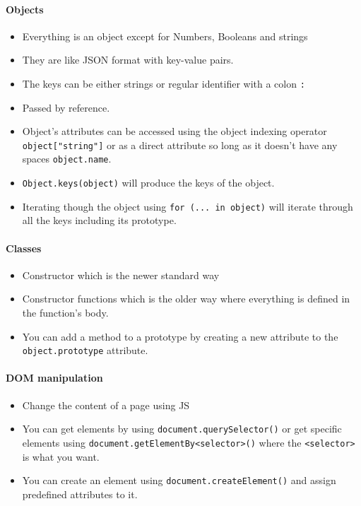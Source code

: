 \documentclass[../CMPUT-404-Notes.tex]{subfiles}
\begin{document}
\paragraph{Objects}
\begin{itemize}
  \item Everything is an object except for Numbers, Booleans and strings
  \item They are like JSON format with key-value pairs.
  \item The keys can be either strings or regular identifier with a colon \texttt{:}
  \item Passed by reference.
  \item Object's attributes can be accessed using the object indexing operator \texttt{object["string"]} or as a direct attribute so long as it doesn't have any spaces \texttt{object.name}.
  \item \texttt{Object.keys(object)} will produce the keys of the object.
  \item Iterating though the object using \texttt{for (... in object)} will iterate through all the keys including its prototype. 
\end{itemize}
\paragraph{Classes}
\begin{itemize}
  \item Constructor which is the newer standard way
  \item Constructor functions which is the older way where everything is defined in the function's body.
  \item You can add a method to a prototype by creating a new attribute to the \texttt{object.prototype} attribute. 
\end{itemize}
\paragraph{DOM manipulation}
\begin{itemize}
  \item Change the content of a page using JS 
  \item You can get elements by using \texttt{document.querySelector()} or get specific elements using \texttt{document.getElementBy<selector>()} where the \texttt{<selector>} is what you want.
  \item You can create an element using \texttt{document.createElement()} and assign predefined attributes to it.  
\end{itemize}
\end{document}

